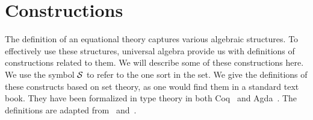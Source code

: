 \section{Constructions}
\label{sec:toBeGenerated}
The definition of an equational theory captures various algebraic structures. To effectively use these structures, universal algebra provide us with definitions of constructions related to them.  We will describe some of these constructions here. We use the symbol $\mathcal{S}$ to refer to the one sort in the set.
We give the definitions of these constructs based on set theory, as one would find them in a standard text book. They have been formalized in type theory in  both Coq~\cite{capretta99, Spitters2010} and Agda~\cite{Gunther2018Agda}. 
The definitions are adapted from~\cite{ehrig1985fundamentals} and~\cite{handbook1993Maibaum}.  

